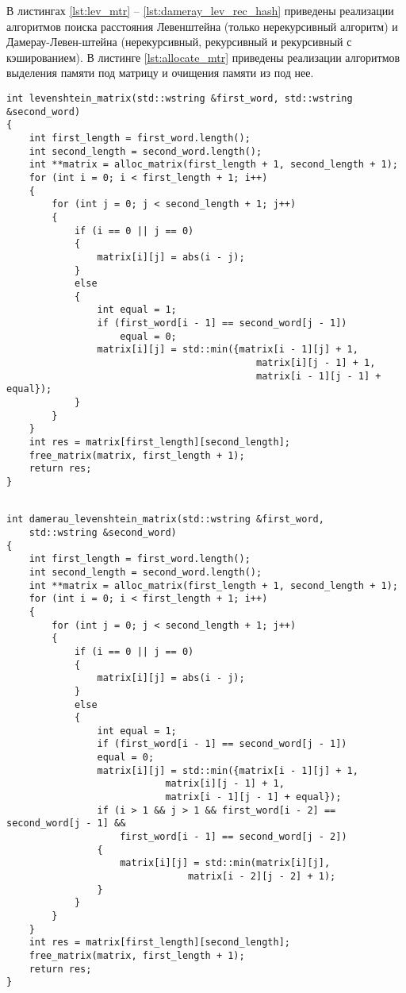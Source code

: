 В листингах \ref{lst:lev_mtr} -- \ref{lst:dameray_lev_rec_hash} приведены реализации алгоритмов поиска расстояния Левенштейна (только нерекурсивный алгоритм) и Дамерау-Левен-штейна (нерекурсивный, рекурсивный и рекурсивный с кэшированием).
В листинге \ref{lst:allocate_mtr} приведены реализации алгоритмов выделения памяти под матрицу и очищения памяти из под нее.

\clearpage

\begin{lstlisting}[label=lst:lev_mtr,caption=Функция нахождения расстояния Левенштейна с использованием матрицы]
int levenshtein_matrix(std::wstring &first_word, std::wstring &second_word)
{
	int first_length = first_word.length();
	int second_length = second_word.length();
	int **matrix = alloc_matrix(first_length + 1, second_length + 1);
	for (int i = 0; i < first_length + 1; i++)
	{
		for (int j = 0; j < second_length + 1; j++)
		{
			if (i == 0 || j == 0)
			{
				matrix[i][j] = abs(i - j);
			}
			else
			{
				int equal = 1;
				if (first_word[i - 1] == second_word[j - 1])
					equal = 0;
				matrix[i][j] = std::min({matrix[i - 1][j] + 1,
											matrix[i][j - 1] + 1,
											matrix[i - 1][j - 1] + equal});
			}
		}
	}
	int res = matrix[first_length][second_length];
	free_matrix(matrix, first_length + 1);
	return res;
}
\end{lstlisting}

\clearpage

\begin{lstlisting}[label=lst:dameray_lev_rec,caption=Функция нахождения расстояния Дамерау-Левенштейна с использованием матрицы]

int damerau_levenshtein_matrix(std::wstring &first_word,
	std::wstring &second_word)
{
	int first_length = first_word.length();
	int second_length = second_word.length();
	int **matrix = alloc_matrix(first_length + 1, second_length + 1);
	for (int i = 0; i < first_length + 1; i++)
	{
		for (int j = 0; j < second_length + 1; j++)
		{
			if (i == 0 || j == 0)
			{
				matrix[i][j] = abs(i - j);
			}
			else
			{
				int equal = 1;
				if (first_word[i - 1] == second_word[j - 1])
				equal = 0;
				matrix[i][j] = std::min({matrix[i - 1][j] + 1,
							matrix[i][j - 1] + 1,
							matrix[i - 1][j - 1] + equal});
				if (i > 1 && j > 1 && first_word[i - 2] == second_word[j - 1] &&
					first_word[i - 1] == second_word[j - 2])
				{
					matrix[i][j] = std::min(matrix[i][j],
								matrix[i - 2][j - 2] + 1);
				}
			}
		}
	}
	int res = matrix[first_length][second_length];
	free_matrix(matrix, first_length + 1);
	return res;
}
\end{lstlisting}

